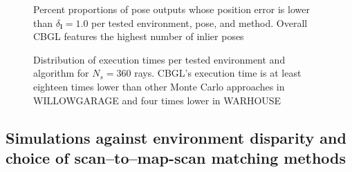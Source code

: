\begin{figure}
  
  \caption{\small Percent proportions of pose outputs whose position error is
           lower than $\delta_{\bm{l}} = 1.0$ per tested environment, pose,
           and method. Overall CBGL features the highest number of inlier poses}
  \label{fig:b:inliers_per_pose}
\end{figure}

\begin{figure}
  
  \vspace{0.1cm}
  \caption{\small Distribution of execution times per tested environment and
           algorithm for $N_s = 360$ rays. CBGL's execution time is at least
           eighteen times lower than other Monte Carlo approaches in
           WILLOWGARAGE and four times lower in WARHOUSE}
  \label{fig:b:execution_times}
\end{figure}


\subsection{Simulations against environment disparity and choice of scan--to--map-scan matching methods}
\begin{figure}
  
  \caption{\small}
  \label{fig:}
\end{figure}
\begin{figure}
  
  \caption{\small}
  \label{fig:}
\end{figure}
